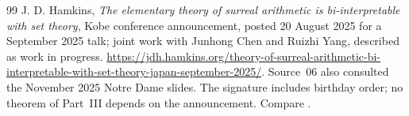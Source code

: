 \documentclass[11pt,a4paper]{article}
\numberwithin{equation}{section}
\theoremstyle{definition}
\theoremstyle{remark}
\begin{document}
\begin{thebibliography}{99}
J. D. Hamkins, \emph{The elementary theory of surreal arithmetic is
bi-interpretable with set theory}, Kobe conference announcement, posted
20 August 2025 for a September 2025 talk; joint work with Junhong Chen and
Ruizhi Yang, described as work in progress.
\url{https://jdh.hamkins.org/theory-of-surreal-arithmetic-bi-interpretable-with-set-theory-japan-september-2025/}.
Source~06 also consulted the November 2025 Notre Dame slides. The signature
includes birthday order; no theorem of Part~III depends on the announcement.
Compare \cite{CHY}.

\end{thebibliography}
\end{document}
